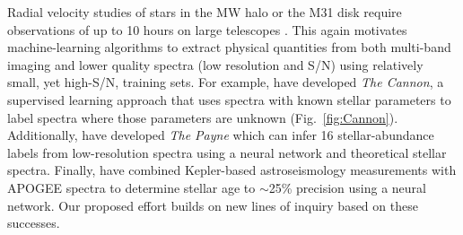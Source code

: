 \documentclass[oneside,11pt]{amsart}
\begin{document}
Radial velocity studies of stars in the MW halo or the
M31 disk require observations of up to 10 hours on large telescopes \citep[e.g.,][]{2018arXiv180904082C}.  This again
motivates machine-learning algorithms
to extract physical quantities from both
multi-band imaging and lower quality spectra (low resolution and S/N)
using relatively small, yet high-S/N, training sets.  For example,
\citet{2015ApJ...808...16N} have developed {\it The Cannon}, a
supervised learning approach that uses spectra with known stellar
parameters to label spectra where those parameters are unknown
(Fig.~\ref{fig:Cannon}).  Additionally, \citet{2018arXiv180401530T} have
developed {\it The Payne} which can infer 16
stellar-abundance labels from low-resolution spectra using a neural
network and theoretical stellar spectra.  Finally,
\citet{2018arXiv180803278T} have combined Kepler-based astroseismology
measurements with APOGEE spectra to determine stellar age to $\sim$25\%
precision using a neural network.  Our proposed effort builds on new
lines of inquiry based on these successes.
\end{document}
